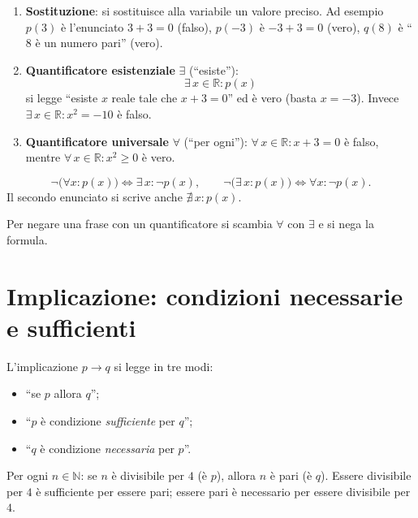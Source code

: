 \documentclass[11pt,a4paper]{article}
\begin{document}
\begin{enumerate}
    \item \textbf{Sostituzione}: si sostituisce alla variabile un valore
          preciso. Ad esempio $p(3)$ è l'enunciato $3 + 3 = 0$ (falso),
          $p(-3)$ è $-3 + 3 = 0$ (vero), $q(8)$ è ``$8$ è un numero pari''
          (vero).

    \item \textbf{Quantificatore esistenziale} $\exists$ (``esiste''):
          \[
          \exists\, x \in \mathbb{R} : p(x)
          \]
          si legge ``esiste $x$ reale tale che $x + 3 = 0$'' ed è vero
          (basta $x = -3$). Invece
          $\exists\, x \in \mathbb{R} : x^2 = -10$ è falso.

    \item \textbf{Quantificatore universale} $\forall$ (``per ogni''):
          $\forall\, x \in \mathbb{R} : x + 3 = 0$ è falso, mentre
          $\forall\, x \in \mathbb{R} : x^2 \geq 0$ è vero.
\end{enumerate}

\begin{proposizione}
\[
\neg\big(\forall x : p(x)\big) \iff \exists\, x : \neg p(x), \qquad
\neg\big(\exists\, x : p(x)\big) \iff \forall x : \neg p(x).
\]
Il secondo enunciato si scrive anche $\nexists\, x : p(x)$.
\end{proposizione}

Per negare una frase con un quantificatore si scambia $\forall$ con
$\exists$ e si nega la formula.

\section{Implicazione: condizioni necessarie e sufficienti}

L'implicazione $p \to q$ si legge in tre modi:
\begin{itemize}
    \item ``se $p$ allora $q$'';
    \item ``$p$ è condizione \emph{sufficiente} per $q$'';
    \item ``$q$ è condizione \emph{necessaria} per $p$''.
\end{itemize}

\begin{esempio}
Per ogni $n \in \mathbb{N}$: se $n$ è divisibile per $4$ (è $p$), allora
$n$ è pari (è $q$). Essere divisibile per $4$ è sufficiente per essere
pari; essere pari è necessario per essere divisibile per $4$.
\end{esempio}
\end{document}
